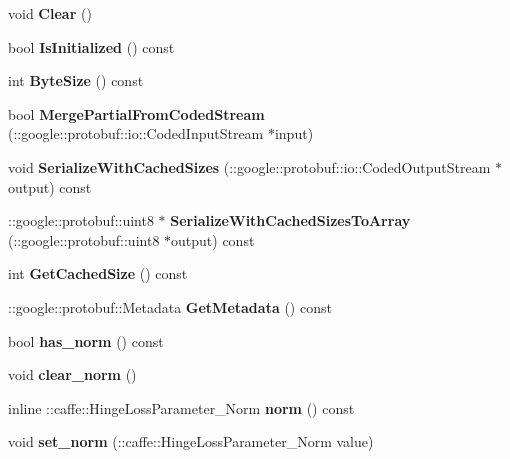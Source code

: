 \begin{DoxyCompactItemize}
void {\bfseries Clear} ()
\item 
\mbox{\label{classcaffe_1_1_hinge_loss_parameter_a8916022a6f2292f2eab8cc9150aae4ca}} 
bool {\bfseries Is\+Initialized} () const
\item 
\mbox{\label{classcaffe_1_1_hinge_loss_parameter_a5895f5b3a4f75fccc36018bc39f37ea2}} 
int {\bfseries Byte\+Size} () const
\item 
\mbox{\label{classcaffe_1_1_hinge_loss_parameter_a6e40cf2b37130609effcd13eaa3931a6}} 
bool {\bfseries Merge\+Partial\+From\+Coded\+Stream} (\+::google\+::protobuf\+::io\+::\+Coded\+Input\+Stream $\ast$input)
\item 
\mbox{\label{classcaffe_1_1_hinge_loss_parameter_af760348be7560d58be07ab49a997cdef}} 
void {\bfseries Serialize\+With\+Cached\+Sizes} (\+::google\+::protobuf\+::io\+::\+Coded\+Output\+Stream $\ast$output) const
\item 
\mbox{\label{classcaffe_1_1_hinge_loss_parameter_ad2359a710cfc09bc1b37568bf9f5d6b3}} 
\+::google\+::protobuf\+::uint8 $\ast$ {\bfseries Serialize\+With\+Cached\+Sizes\+To\+Array} (\+::google\+::protobuf\+::uint8 $\ast$output) const
\item 
\mbox{\label{classcaffe_1_1_hinge_loss_parameter_a7c81cb3d358362bc9d339256c4d57507}} 
int {\bfseries Get\+Cached\+Size} () const
\item 
\mbox{\label{classcaffe_1_1_hinge_loss_parameter_a2625f2703892bdd531322943e0c0544d}} 
\+::google\+::protobuf\+::\+Metadata {\bfseries Get\+Metadata} () const
\item 
\mbox{\label{classcaffe_1_1_hinge_loss_parameter_aae9a435db23621ab9f4c516955659b44}} 
bool {\bfseries has\+\_\+norm} () const
\item 
\mbox{\label{classcaffe_1_1_hinge_loss_parameter_af17dabc6c1747085890c12fd1517c690}} 
void {\bfseries clear\+\_\+norm} ()
\item 
\mbox{\label{classcaffe_1_1_hinge_loss_parameter_a1f23f8b76021c134d3c3d60ffd1b8123}} 
inline \+::caffe\+::\+Hinge\+Loss\+Parameter\+\_\+\+Norm {\bfseries norm} () const
\item 
\mbox{\label{classcaffe_1_1_hinge_loss_parameter_ac33092a2b8db6e0d6c9c66576a043447}} 
void {\bfseries set\+\_\+norm} (\+::caffe\+::\+Hinge\+Loss\+Parameter\+\_\+\+Norm value)
\end{DoxyCompactItemize}
